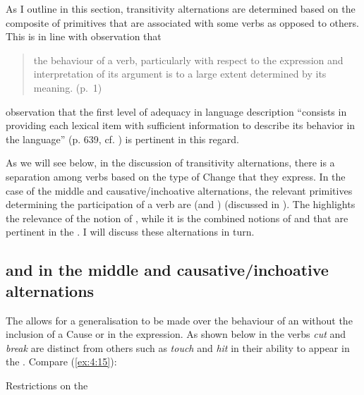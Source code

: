As I outline in this section, transitivity alternations are determined
based on the composite of primitives that are associated with some
verbs as opposed to others. This is in line with 
observation that

\begin{quote}
the behaviour of a verb, particularly with respect to the expression
and interpretation of its argument is to a large extent determined by
its meaning. (p.~1)
\end{quote}

 observation that the first level of adequacy
in language description ``consists in providing each lexical item with
sufficient information to describe its behavior in the language”
(p. 639, cf. \citealt{Chomsky1965}) is pertinent in this regard.

As we will see below, in the discussion of transitivity alternations,
there is a separation among verbs based on the type of Change that
they express.  In the case of the middle and causative\slash inchoative
alternations, the relevant primitives determining the participation of
a verb are \BECOME (and \CAUSE) (discussed in ).  The
 highlights the relevance of
the notion of \CONTACT, while it is the combined notions of \MOTION and
\CONTACT that are pertinent in the . I will discuss
these alternations in turn.


\subsection{\CAUSE and \BECOME in the middle and causative/inchoative
  alternations}\label{sec:4.4.1}

The  allows for a generalisation to be made over the
behaviour of an  without the inclusion of a Cause or
 in the expression.  As shown below in  the verbs
\textit{cut} and \textit{break} are distinct from others such as \textit{touch} and \textit{hit}
in their ability to appear in the .  Compare (\ref{ex:4:15}):

\ea\label{ex:4:15} Restrictions on the  \citep[6, example 13]{Levin1993}\\
\z \z

